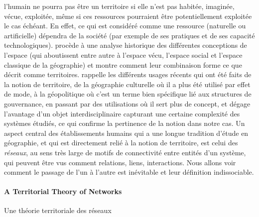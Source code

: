 {l'humain ne pourra pas être un territoire si elle n'est pas habitée, imaginée, vécue, exploitée, même si ces ressources pourraient être potentiellement exploitée le cas échéant. En effet, ce qui est considéré comme une ressource (naturelle ou artificielle) dépendra de la société (par exemple de ses pratiques et de ses capacité technologiques). \cite{di1998espace} procède à une analyse historique des différentes conceptions de l'espace (qui aboutissent entre autre à l'espace vécu, l'espace social et l'espace classique de la géographie) et montre comment leur combinaison forme ce que  décrit comme territoires. \cite{giraut2008conceptualiser} rappelle les différents usages récents qui ont été faits de la notion de territoire, de la géographie culturelle où il a plus été utilisé par effet de mode, à la géopolitique où c'est un terme bien spécifique lié aux structures de gouvernance, en passant par des utilisations où il sert plus de concept, et dégage l'avantage d'un objet interdisciplinaire capturant une certaine complexité des systèmes étudiés, ce qui confirme la pertinence de la notion dans notre cas. Un aspect central des établissements humains qui a une longue tradition d'étude en géographie, et qui est directement relié à la notion de territoire, est celui des \emph{réseaux}, au sens très large de motifs de connectivité entre entités d'un système, qui peuvent être vus comment relations, liens, interactions. Nous allons voir comment le passage de l'un à l'autre est inévitable et leur définition indissociable.
}


\paragraph{A Territorial Theory of Networks}{Une théorie territoriale des réseaux}


